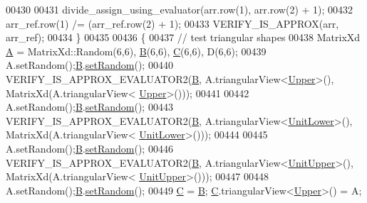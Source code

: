\begin{DoxyCode}
00430 
00431     divide\_assign\_using\_evaluator(arr.row(1), arr.row(2) + 1);
00432     arr\_ref.row(1) /= (arr\_ref.row(2) + 1);
00433     VERIFY\_IS\_APPROX(arr, arr\_ref);
00434   \}
00435   
00436   \{
00437     \textcolor{comment}{// test triangular shapes}
00438     MatrixXd \hyperlink{group___core___module_class_eigen_1_1_matrix}{A} = MatrixXd::Random(6,6), \hyperlink{group___core___module_class_eigen_1_1_matrix}{B}(6,6), \hyperlink{group___core___module}{C}(6,6), D(6,6);
00439     A.setRandom();\hyperlink{group___core___module_class_eigen_1_1_matrix}{B}.\hyperlink{class_eigen_1_1_plain_object_base_af0e576a0e1aefc9ee346de44cc352ba3}{setRandom}();
00440     VERIFY\_IS\_APPROX\_EVALUATOR2(\hyperlink{group___core___module_class_eigen_1_1_matrix}{B}, A.triangularView<\hyperlink{group__enums_gga39e3366ff5554d731e7dc8bb642f83cda6bcb58be3b8b8ec84859ce0c5ac0aaec}{Upper}>(), MatrixXd(A.triangularView<
      \hyperlink{group__enums_gga39e3366ff5554d731e7dc8bb642f83cda6bcb58be3b8b8ec84859ce0c5ac0aaec}{Upper}>()));
00441     
00442     A.setRandom();\hyperlink{group___core___module_class_eigen_1_1_matrix}{B}.\hyperlink{class_eigen_1_1_plain_object_base_af0e576a0e1aefc9ee346de44cc352ba3}{setRandom}();
00443     VERIFY\_IS\_APPROX\_EVALUATOR2(\hyperlink{group___core___module_class_eigen_1_1_matrix}{B}, A.triangularView<\hyperlink{group__enums_gga39e3366ff5554d731e7dc8bb642f83cda8155cfdfde9e75e7144dff0393d17181}{UnitLower}>(), MatrixXd(A.triangularView<
      \hyperlink{group__enums_gga39e3366ff5554d731e7dc8bb642f83cda8155cfdfde9e75e7144dff0393d17181}{UnitLower}>()));
00444     
00445     A.setRandom();\hyperlink{group___core___module_class_eigen_1_1_matrix}{B}.\hyperlink{class_eigen_1_1_plain_object_base_af0e576a0e1aefc9ee346de44cc352ba3}{setRandom}();
00446     VERIFY\_IS\_APPROX\_EVALUATOR2(\hyperlink{group___core___module_class_eigen_1_1_matrix}{B}, A.triangularView<\hyperlink{group__enums_gga39e3366ff5554d731e7dc8bb642f83cda8b0b63ff46dcd7377b59df14e0562fc1}{UnitUpper}>(), MatrixXd(A.triangularView<
      \hyperlink{group__enums_gga39e3366ff5554d731e7dc8bb642f83cda8b0b63ff46dcd7377b59df14e0562fc1}{UnitUpper}>()));
00447     
00448     A.setRandom();\hyperlink{group___core___module_class_eigen_1_1_matrix}{B}.\hyperlink{class_eigen_1_1_plain_object_base_af0e576a0e1aefc9ee346de44cc352ba3}{setRandom}();
00449     \hyperlink{group___core___module}{C} = \hyperlink{group___core___module_class_eigen_1_1_matrix}{B}; \hyperlink{group___core___module}{C}.triangularView<\hyperlink{group__enums_gga39e3366ff5554d731e7dc8bb642f83cda6bcb58be3b8b8ec84859ce0c5ac0aaec}{Upper}>() = A;

\end{DoxyCode}
